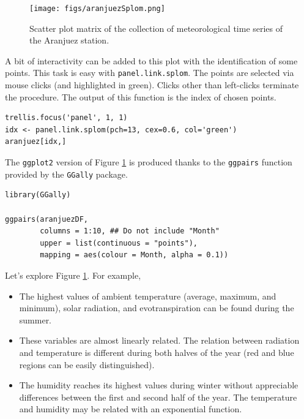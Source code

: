 \documentclass[smallroyalvopaper]{memoir}
\begin{document}
\begin{figure}[htbp]
\centering
\texttt{[image: figs/aranjuezSplom.png]}
\caption{Scatter plot matrix of the collection of meteorological time series of the Aranjuez station. \label{fig:aranjuezSplom}}
\end{figure}

A bit of interactivity can be added to this plot with the
identification of some points. This task is easy with
\texttt{panel.link.splom}. The points are selected via mouse clicks (and
highlighted in green). Clicks other than left-clicks terminate the
procedure. The output of this function is the index of chosen
points.


\lstset{language=r,label= ,caption= ,captionpos=b,numbers=none}
\begin{lstlisting}
trellis.focus('panel', 1, 1)
idx <- panel.link.splom(pch=13, cex=0.6, col='green')
aranjuez[idx,]
\end{lstlisting}

The \texttt{ggplot2} version of Figure \ref{fig:aranjuezSplom} is produced
thanks to the \texttt{ggpairs} function provided by the \texttt{GGally} package.


\lstset{language=r,label= ,caption= ,captionpos=b,numbers=none}
\begin{lstlisting}
library(GGally)

ggpairs(aranjuezDF,
        columns = 1:10, ## Do not include "Month"
        upper = list(continuous = "points"),
        mapping = aes(colour = Month, alpha = 0.1))
\end{lstlisting}

Let's explore Figure \ref{fig:aranjuezSplom}. For example,
\begin{itemize}
\item The highest values of ambient temperature (average, maximum, and
minimum), solar radiation, and evotranspiration can be found during
the summer.
\item These variables are almost linearly related. The relation between
radiation and temperature is different during both halves of the
year (red and blue regions can be easily distinguished).
\item The humidity reaches its highest values during winter without
appreciable differences between the first and second half of the
year. The temperature and humidity may be related with an
exponential function.
\end{itemize}
\end{document}
